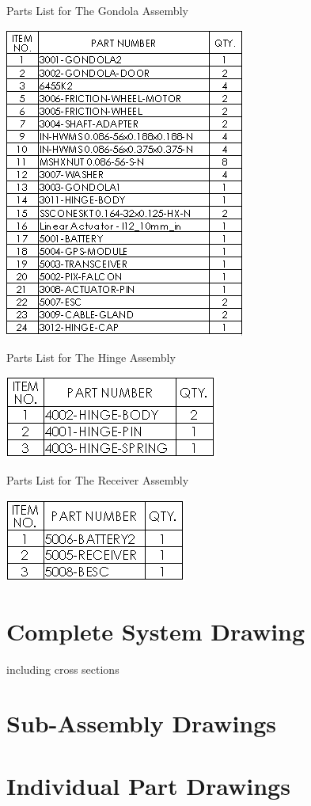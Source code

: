 \documentclass[../main.tex]{subfiles}
\begin{document}
	\begin{table}[H]
		\centering
		\caption{Parts List for The Gondola Assembly}
		\includegraphics[width=.5\linewidth]{img/dwgs/gondolaAsm.PNG}
		\label{fig:gondolaParts}
	\end{table}

	\begin{table}[H]
		\centering
		\caption{Parts List for The Hinge Assembly}
		\includegraphics[width=.4\linewidth]{img/dwgs/hingeAsm.PNG}
		\label{fig:hingeParts}
	\end{table}

	\begin{table}[H]
		\centering
		\caption{Parts List for The Receiver Assembly}
		\includegraphics[width=.35\linewidth]{img/dwgs/receiverAsm.PNG}
		\label{fig:recieverParts}
	\end{table}

	\section{Complete System Drawing}
	including cross sections
	
	\section{Sub-Assembly Drawings}
	
	\section{Individual Part Drawings}
\end{document}
